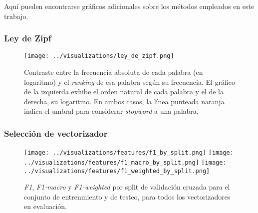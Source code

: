 Aqu\'i pueden encontrarse gr\'aficos adicionales sobre los m\'etodos empleados
en este trabajo.

\subsubsection{Ley de Zipf}
\label{appendix-plots-zipf-law}

\begin{figure}[!htb]
    \centering
    \texttt{[image: ../visualizations/ley\_de\_zipf.png]}
    \caption{Contraste entre la frecuencia absoluta de cada palabra (en logaritmo)
    y el \textit{ranking} de esa palabra seg\'un su frecuencia. El gr\'afico de la
    izquierda exhibe el orden natural de cada palabra y el de la derecha, su logaritmo.
    En ambos casos, la l\'inea punteada naranja indica el umbral
    para considerar \textit{stopword} a una palabra.}
    \label{fig-zipf-law}
\end{figure}
\FloatBarrier

\subsubsection{Selecci\'on de vectorizador}
\label{appendix-plots-vectorizers}

\begin{figure}[!htb]
    \centering
    \texttt{[image: ../visualizations/features/f1\_by\_split.png]}
    \vfill
    \texttt{[image: ../visualizations/features/f1\_macro\_by\_split.png]}
    \vfill
    \texttt{[image: ../visualizations/features/f1\_weighted\_by\_split.png]}
    \caption{\textit{F1}, \textit{F1-macro} y \textit{F1-weighted} por split
    de validaci\'on cruzada para el conjunto de entrenmiento y de testeo,
    para todos los vectorizadores en evaluaci\'on.}
    \label{fig-vectorizers-f1}
\end{figure}
\FloatBarrier

